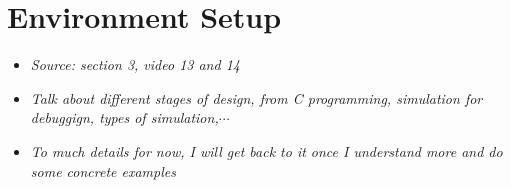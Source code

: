 \section{Environment Setup}

 

\begin{itemize}

\item \textit{Source: section 3, video 13 and 14}

\item \textit{Talk about different stages of design, from C programming, simulation for debuggign, types of simulation,$\cdots$}

\item \textit{To much details for now, I will get back to it once I understand more and do some concrete examples}


\end{itemize}








